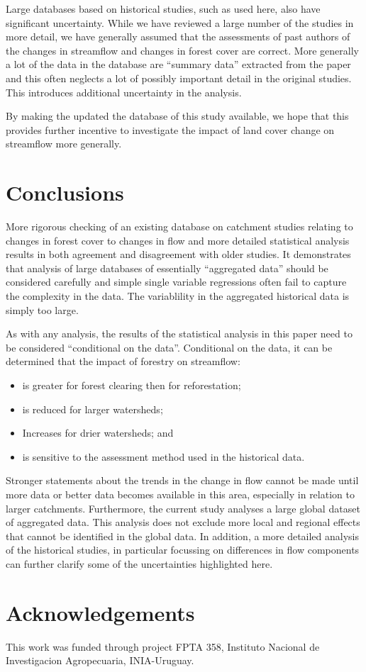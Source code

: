 \documentclass[]{elsarticle} %
\begin{document}
Large databases based on historical studies, such as used here, also have significant uncertainty. While we have reviewed a large number of the studies in more detail, we have generally assumed that the assessments of past authors of the changes in streamflow and changes in forest cover are correct. More generally a lot of the data in the database are ``summary data'' extracted from the paper and this often neglects a lot of possibly important detail in the original studies. This introduces additional uncertainty in the analysis.

By making the updated the database of this study available, we hope that this provides further incentive to investigate the impact of land cover change on streamflow more generally.

\hypertarget{conclusions}{%
\section{Conclusions}\label{conclusions}}

More rigorous checking of an existing database on catchment studies relating to changes in forest cover to changes in flow and more detailed statistical analysis results in both agreement and disagreement with older studies. It demonstrates that analysis of large databases of essentially ``aggregated data'' should be considered carefully and simple single variable regressions often fail to capture the complexity in the data. The variablility in the aggregated historical data is simply too large.

As with any analysis, the results of the statistical analysis in this paper need to be considered ``conditional on the data''.
Conditional on the data, it can be determined that the impact of forestry on streamflow:

\begin{itemize}
\item
  is greater for forest clearing then for reforestation;
\item
  is reduced for larger watersheds;
\item
  Increases for drier watersheds; and
\item
  is sensitive to the assessment method used in the historical data.
\end{itemize}

Stronger statements about the trends in the change in flow cannot be made until more data or better data becomes available in this area, especially in relation to larger catchments. Furthermore, the current study analyses a large global dataset of aggregated data. This analysis does not exclude more local and regional effects that cannot be identified in the global data. In addition, a more detailed analysis of the historical studies, in particular focussing on differences in flow components can further clarify some of the uncertainties highlighted here.

\hypertarget{acknowledgements}{%
\section{Acknowledgements}\label{acknowledgements}}

This work was funded through project FPTA 358, Instituto Nacional de Investigacion Agropecuaria, INIA-Uruguay.

\renewcommand\refname{References}

\end{document}
